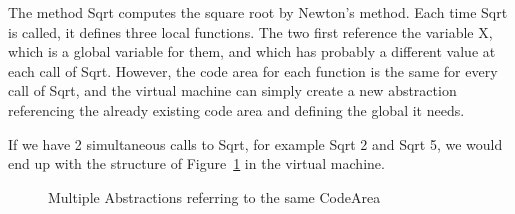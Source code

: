 \documentclass[a4paper]{memoir}
\begin{document}
The method Sqrt computes the square root by Newton's method. Each time Sqrt is
called, it defines three local functions. The two first reference the variable
X, which is a global variable for them, and which has probably a different
value at each call of Sqrt. However, the code area for each function is the
same for every call of Sqrt, and the virtual machine can simply create a new
abstraction referencing the already existing code area and defining the global
it needs. 

If we have 2 simultaneous calls to Sqrt, for example {Sqrt 2} and {Sqrt 5}, we
would end up with the structure of Figure~\ref{fig:blurps} 
in the virtual machine.


\begin{figure}[h]
  \centering
{}
\caption{Multiple Abstractions referring to the same CodeArea}
\label{fig:blurps}
\end{figure}
\end{document}

